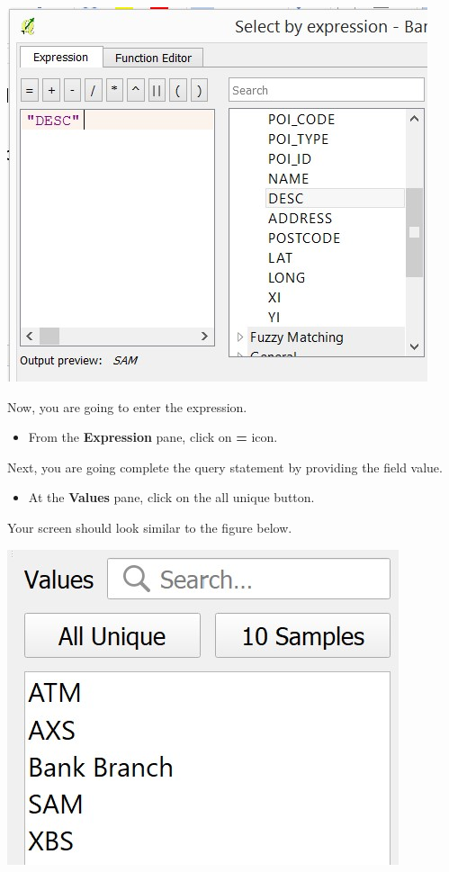 \documentclass[
  letterpaper,
  DIV=11,
  numbers=noendperiod]{scrreprt}
\providecommand{\tightlist}{%
  \setlength{\itemsep}{0pt}\setlength{\parskip}{0pt}}\usepackage{longtable,booktabs,array}
\begin{document}
\includegraphics{./img05/image4.jpg}

Now, you are going to enter the expression.

\begin{itemize}
\tightlist
\item
  From the \textbf{Expression} pane, click on \textbf{=} icon.
\end{itemize}

Next, you are going complete the query statement by providing the field
value.

\begin{itemize}
\tightlist
\item
  At the \textbf{Values} pane, click on the all unique button.
\end{itemize}

Your screen should look similar to the figure below.

\includegraphics{./img05/image5.jpg}
\end{document}
